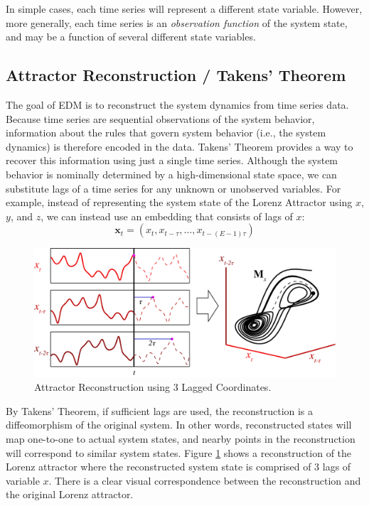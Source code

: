 \documentclass[article]{jss}
\begin{document}
In simple cases, each time series will represent a different state variable. However, more generally, each time series is an \emph{observation function} of the system state, and may be a function of several different state variables. 

\subsection{Attractor Reconstruction / Takens' Theorem}\label{sec:attractor-reconstruction}

The goal of EDM is to reconstruct the system dynamics from time series data. Because time series are sequential observations of the system behavior, information about the rules that govern system behavior (i.e., the system dynamics) is therefore encoded in the data. Takens' Theorem \citep{Takens_1981} provides a way to recover this information using just a single time series. Although the system behavior is nominally determined by a high-dimensional state space, we can substitute lags of a time series for any unknown or unobserved variables. For example, instead of representing the system state of the Lorenz Attractor using $x$, $y$, and $z$, we can instead use an embedding that consists of  lags of $x$:
\begin{equation}
\mathbf{x}_t = \left( x_t, x_{t-\tau}, \dots, x_{t-(E-1)\tau} \right)
\end{equation}

\begin{figure}[t!]
\centering
\includegraphics{figure_2}
\caption{\label{fig:attractor-reconstruction} Attractor Reconstruction using 3 Lagged Coordinates.}
\end{figure}

By Takens' Theorem, if sufficient lags are used, the reconstruction is a diffeomorphism of the original system. In other words, reconstructed states will map one-to-one to actual system states, and nearby points in the reconstruction will correspond to similar system states. Figure \ref{fig:attractor-reconstruction} shows a reconstruction of the Lorenz attractor where the reconstructed system state is comprised of 3 lags of variable $x$. There is a clear visual correspondence between the reconstruction and the original Lorenz attractor.
\end{document}
